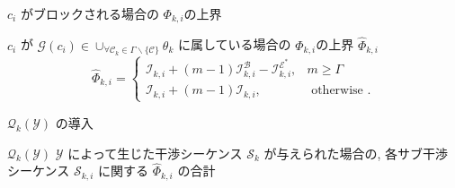\begin{frame}{$c_{i}$ がブロックされる場合の $\Phi_{k, i}$の上界}
    \begin{definition}
        $c_{i}$ が $\mathcal{G}\left(c_{i}\right) \in \cup_{\forall \mathcal{C}_{k} \in \Gamma \backslash\{\mathcal{C}\}} \theta_{k}$ に属している場合の $\Phi_{k, i}$の上界 $\hat{\Phi}_{k, i}$
        \begin{equation*}
            \hat{\Phi}_{k, i}=\left\{\begin{array}{lr}
                \mathcal{I}_{k, i}+(m-1) \mathcal{I}_{k, i}^{\mathcal{B}}-\mathcal{I}_{k, i}^{\mathcal{E}^{*}}, & m \geq \Gamma         \\
                \mathcal{I}_{k, i}+(m-1) \mathcal{I}_{k, i},                                                    & \text { otherwise } .
            \end{array}\right.
        \end{equation*}
    \end{definition}
\end{frame}


\begin{frame}{$\mathcal{Q}_{k}(\mathcal{Y})$ の導入}
    \begin{block}{$\mathcal{Q}_{k}(\mathcal{Y})$}
        $\mathcal{Y}$ によって生じた干渉シーケンス $\mathcal{S}_{k}$ が与えられた場合の, 各サブ干渉シーケンス $\mathcal{S}_{k, i}$ に関する $\hat{\Phi}_{k, i}$ の合計
    \end{block}
\end{frame}

